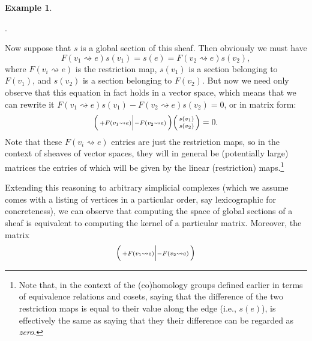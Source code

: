 \documentclass[a4paper]{book}
\theoremstyle{definition}
\newtheorem{example}{Example}[section]
\theoremstyle{definition}
\theoremstyle{definition}
\theoremstyle{theorem}
\theoremstyle{definition}
\begin{document}
\begin{example}
\begin{center}
.
 \end{center} 
 Now suppose that $s$ is a global section of this sheaf. Then obviously we must have 
 \begin{equation}
 F(v_1 \rightsquigarrow e) s(v_1) = s(e) = F(v_2 \rightsquigarrow e) s(v_2),
 \end{equation}
 where $F(v_i \rightsquigarrow e)$ is the restriction map, $s(v_1)$ is a section belonging to $F(v_1)$, and $s(v_2)$ is a section belonging to $F(v_2)$. But now we need only observe that this equation in fact holds in a vector space, which means that we can rewrite it $F(v_1 \rightsquigarrow e) s(v_1) - F(v_2 \rightsquigarrow e) s(v_2) = 0$, or in matrix form: 
 \begin{equation}
 \begin{psmallmatrix}
 +F(v_1 \rightsquigarrow e) \Big| - F(v_2 \rightsquigarrow e) \end{psmallmatrix} \begin{psmallmatrix}
 s(v_1) \\ s(v_2)
 \end{psmallmatrix} = 0.
 \end{equation} 
 Note that these $F(v_i \rightsquigarrow e)$ entries are just the restriction maps, so in the context of sheaves of vector spaces, they will in general be (potentially large) matrices the entries of which will be given by the linear (restriction) maps.\footnote{Note that, in the context of the (co)homology groups defined earlier in terms of equivalence relations and cosets, saying that the difference of the two restriction maps is equal to their value along the edge (i.e., $s(e)$), is effectively the same as saying that they their difference can be regarded as \textit{zero}.}\par 
 Extending this reasoning to arbitrary simplicial complexes (which we assume comes with a listing of vertices in a particular order, say lexicographic for concreteness), we can observe that computing the space of global sections of a sheaf is equivalent to computing the kernel of a particular matrix. Moreover, the matrix 
  \begin{equation*}
  \begin{psmallmatrix}
  +F(v_1 \rightsquigarrow e) \Big| - F(v_2 \rightsquigarrow e) \end{psmallmatrix}

\end{equation*}
\end{example}
\end{document}
